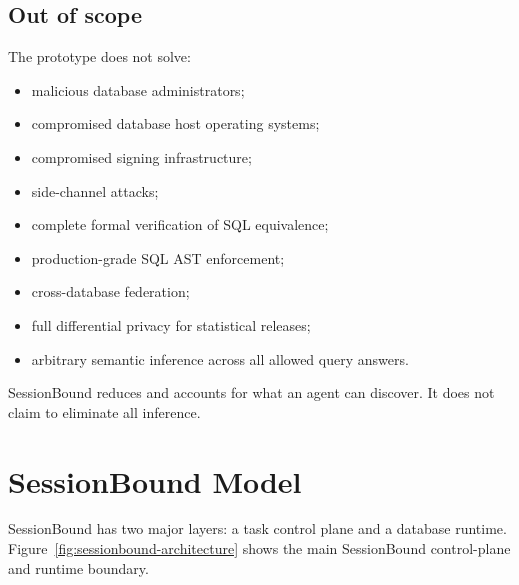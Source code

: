 \documentclass[journal]{IEEEtran}
\providecommand{\tightlist}{%
  \setlength{\itemsep}{0pt}\setlength{\parskip}{0pt}}
\begin{document}
\hypertarget{out-of-scope}{%
\subsection{Out of scope}\label{out-of-scope}}

The prototype does not solve:

\begin{itemize}
\tightlist
\item
  malicious database administrators;
\item
  compromised database host operating systems;
\item
  compromised signing infrastructure;
\item
  side-channel attacks;
\item
  complete formal verification of SQL equivalence;
\item
  production-grade SQL AST enforcement;
\item
  cross-database federation;
\item
  full differential privacy for statistical releases;
\item
  arbitrary semantic inference across all allowed query answers.
\end{itemize}

SessionBound reduces and accounts for what an agent can discover. It
does not claim to eliminate all inference.


\hypertarget{sessionbound-model}{%
\section{SessionBound Model}\label{sessionbound-model}}

SessionBound has two major layers: a task control plane and a database
runtime. Figure~\ref{fig:sessionbound-architecture} shows the main
SessionBound control-plane and runtime boundary.
\end{document}
